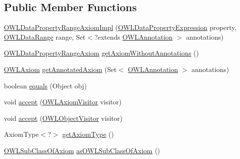 \subsection*{Public Member Functions}
\begin{DoxyCompactItemize}
\item 
\hyperlink{classuk_1_1ac_1_1manchester_1_1cs_1_1owl_1_1owlapi_1_1_o_w_l_data_property_range_axiom_impl_a5ce4df09946658dd7f4752e1b82ce441}{O\-W\-L\-Data\-Property\-Range\-Axiom\-Impl} (\hyperlink{interfaceorg_1_1semanticweb_1_1owlapi_1_1model_1_1_o_w_l_data_property_expression}{O\-W\-L\-Data\-Property\-Expression} property, \hyperlink{interfaceorg_1_1semanticweb_1_1owlapi_1_1model_1_1_o_w_l_data_range}{O\-W\-L\-Data\-Range} range, Set$<$?extends \hyperlink{interfaceorg_1_1semanticweb_1_1owlapi_1_1model_1_1_o_w_l_annotation}{O\-W\-L\-Annotation} $>$ annotations)
\item 
\hyperlink{interfaceorg_1_1semanticweb_1_1owlapi_1_1model_1_1_o_w_l_data_property_range_axiom}{O\-W\-L\-Data\-Property\-Range\-Axiom} \hyperlink{classuk_1_1ac_1_1manchester_1_1cs_1_1owl_1_1owlapi_1_1_o_w_l_data_property_range_axiom_impl_adcee024562b1149a5f7d91ebc4e97f3a}{get\-Axiom\-Without\-Annotations} ()
\item 
\hyperlink{interfaceorg_1_1semanticweb_1_1owlapi_1_1model_1_1_o_w_l_axiom}{O\-W\-L\-Axiom} \hyperlink{classuk_1_1ac_1_1manchester_1_1cs_1_1owl_1_1owlapi_1_1_o_w_l_data_property_range_axiom_impl_a9c5e83bebe9714bcc54b1ed4a218c323}{get\-Annotated\-Axiom} (Set$<$ \hyperlink{interfaceorg_1_1semanticweb_1_1owlapi_1_1model_1_1_o_w_l_annotation}{O\-W\-L\-Annotation} $>$ annotations)
\item 
boolean \hyperlink{classuk_1_1ac_1_1manchester_1_1cs_1_1owl_1_1owlapi_1_1_o_w_l_data_property_range_axiom_impl_abf49ea794f3620079ef943799a27827d}{equals} (Object obj)
\item 
void \hyperlink{classuk_1_1ac_1_1manchester_1_1cs_1_1owl_1_1owlapi_1_1_o_w_l_data_property_range_axiom_impl_a4439ea9b61e278d66e0e7823569b6006}{accept} (\hyperlink{interfaceorg_1_1semanticweb_1_1owlapi_1_1model_1_1_o_w_l_axiom_visitor}{O\-W\-L\-Axiom\-Visitor} visitor)
\item 
void \hyperlink{classuk_1_1ac_1_1manchester_1_1cs_1_1owl_1_1owlapi_1_1_o_w_l_data_property_range_axiom_impl_abbc1a8b8b6f5dc780727381dd0814166}{accept} (\hyperlink{interfaceorg_1_1semanticweb_1_1owlapi_1_1model_1_1_o_w_l_object_visitor}{O\-W\-L\-Object\-Visitor} visitor)
\item 
Axiom\-Type$<$?$>$ \hyperlink{classuk_1_1ac_1_1manchester_1_1cs_1_1owl_1_1owlapi_1_1_o_w_l_data_property_range_axiom_impl_a8327d263cf2c968b3151a0c6952da397}{get\-Axiom\-Type} ()
\item 
\hyperlink{interfaceorg_1_1semanticweb_1_1owlapi_1_1model_1_1_o_w_l_sub_class_of_axiom}{O\-W\-L\-Sub\-Class\-Of\-Axiom} \hyperlink{classuk_1_1ac_1_1manchester_1_1cs_1_1owl_1_1owlapi_1_1_o_w_l_data_property_range_axiom_impl_af8b5d019c84eee5a4248b79470a7c9b3}{as\-O\-W\-L\-Sub\-Class\-Of\-Axiom} ()
\end{DoxyCompactItemize}
